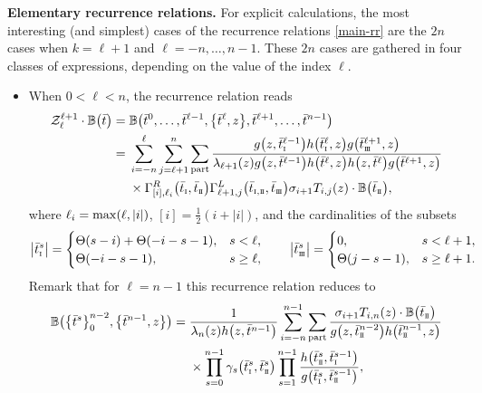 \documentclass[10pt,a4paper]{amsart}
\newcommand{\so}{\scriptscriptstyle \rm I}
\newcommand{\st}{\scriptscriptstyle \rm I\hspace{-1pt}I}
\newcommand{\sth}{\scriptscriptstyle \rm I\hspace{-1pt}I\hspace{-1pt}I}
\newcommand{\bt}{{\bar t}}
\theoremstyle{definition}
\def\BB{{\mathbb{B}}}
\def\r#1{\eqref{#1}}
\def\Z{\mathcal{Z}}
\def\Gml{\Gamma^L}
\def\Gmr{\Gamma^R}
\begin{document}
{\bf Elementary recurrence relations.}
For explicit calculations, the most interesting (and simplest) cases of the recurrence
relations \r{main-rr} are the $2n$ cases when $k=\ell+1$ and $\ell=-n,\dots,n-1$.
These $2n$ cases are gathered in four classes of expressions, depending on the value of the index $\ell$.
\begin{itemize}\itemsep=0pt
\item When $0<\ell<n$, the recurrence relation reads
\begin{align*}%
\begin{split}
\Z^{\ell+1}_{\ell}\cdot\BB\bigl(\bt\bigr)={}&
\BB\bigl(\bt^0,\dots,\bt^{\ell-1},\bigl\{\bt^\ell,z\bigr\},\bt^{\ell+1},\dots,\bt^{n-1}\bigr)\\
={}&\sum_{i=-n}^{\ell}\sum_{j=\ell+1}^n\sum_{\rm part}
\frac{g\bigl(z,\bt^{\ell-1}_{\so}\bigr) h\bigl(\bt^{\ell}_{\so},z\bigr) g\bigl(\bt^{\ell+1}_{\sth},z\bigr)}
{\lambda_{\ell+1}(z) g\bigl(z,\bt^{\ell-1}\bigr) h\bigl(\bt^{\ell},z\bigr)
h\bigl(z,\bt^{\ell}\bigr) g\bigl(\bt^{\ell+1},z\bigr)}\\
&\times \Gmr_{[i],\ell_i}\bigl(\bt_{\so},\bt_{{\st}}\bigr)
\Gml_{\ell+1,j}\bigl(\bt_{{\so},{\st}},\bt_{{\sth}}\bigr) \sigma_{i+1}
T_{i,j}(z)\cdot \BB\bigl(\bt_{\st}\bigr) ,
\end{split}
\end{align*}
where $\ell_i={\rm max}(\ell,|i|)$, $[i]=\frac12(i+|i|)$, and the cardinalities of the subsets
\[%
\big|\bt^s_{\so}\big|=\begin{cases}
\Theta(s-i)+\Theta(-i-s-1), &s<\ell,\\
\Theta(-i-s-1), &s\geq \ell,
\end{cases}\qquad
\big|\bt^s_{\sth}\big|=\begin{cases}
0, &s<\ell+1,\\
\Theta(j-s-1), &s\geq \ell+1.
\end{cases}
\]
Remark that for $\ell=n-1$ this recurrence relation reduces to
\begin{align*}
\BB\bigl(\bigl\{\bt^s\bigr\}_{0}^{n-2},\bigl\{\bt^{n-1},z\bigr\}\bigr)={}&\frac{1}{\lambda_n(z) h\bigl(z,\bt^{n-1}\bigr)}\sum_{i=-n}^{n-1}\sum_{\rm part}
\frac{\sigma_{i+1} T_{i,n}(z)\cdot
\BB\bigl(\bt_{\st}\bigr)}{g\bigl(z,\bt^{n-2}_{\st}\bigr) h\bigl(\bt^{n-1}_{\st},z\bigr)}\\
&\times
\prod_{s=0}^{n-1}\gamma_s\bigl(\bt^s_{\so},\bt^s_{\st}\bigr)
\prod_{s=1}^{n-1}\frac{h\bigl(\bt^s_{\st},\bt^{s-1}_{\so}\bigr)}{g\bigl(\bt^s_{\so},\bt^{s-1}_{\st}\bigr)},
\end{align*}

\end{itemize}
\end{document}
